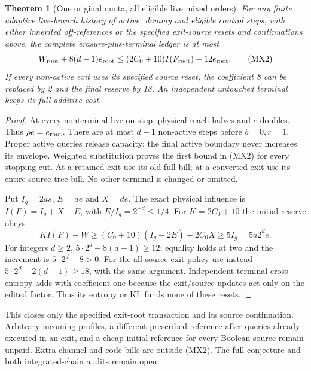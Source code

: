 \documentclass[11pt]{article}
\newtheorem{theorem}[lemma]{Theorem}
\begin{document}
\begin{theorem}[One original quota, all eligible live mixed orders]
For any finite adaptive live-branch history of active, dummy and
eligible control steps, with either inherited off-references or
the specified exit-source resets and continuations above, the
complete erasure-plus-terminal ledger is at most
\[
 W_{\rm root}+8(d-1)e_{\rm root}
 \le (2C_0+10)I(F_{\rm root})-12e_{\rm root}.
 \tag{MX2}
\]
If every non-active exit uses its specified source reset, the
coefficient 8 can be replaced by 2 and the final reserve by 18.
An independent untouched terminal keeps its full additive cost.
\end{theorem}
\begin{proof}
At every nonterminal live on-step, physical reach halves and
$e$ doubles. Thus $\rho e=e_{\rm root}$. There are at most
$d-1$ non-active steps before $b=0,r=1$. Proper active queries
release capacity; the final active boundary never increases its
envelope. Weighted substitution proves the first bound in (MX2)
for every stopping cut. At a retained exit use its old full bill;
at a converted exit use its entire source-tree bill. No other
terminal is changed or omitted.

Put $I_g=2as$, $E=ae$ and $X=de$. The exact physical influence
is $I(F)=I_g+X-E$, with $E/I_g=2^{-d}\le1/4$. For
$K=2C_0+10$ the initial reserve obeys
\[
 KI(F)-W\ge(C_0+10)(I_g-2E)+2C_0X\ge5I_g
              =5a2^d e.
\]
For integers $d\ge2$, $5\cdot2^d-8(d-1)\ge12$; equality
holds at two and the increment is $5\cdot2^d-8>0$.
For the all-source-exit policy use instead
$5\cdot2^d-2(d-1)\ge18$, with the same argument.
Independent terminal cross entropy adds with coefficient one
because the exit/source updates act only on the edited factor.
Thus its entropy or KL funds none of these resets.
\end{proof}

This closes only the specified exit-root transaction and its
source continuation. Arbitrary incoming profiles, a different
prescribed reference after queries already executed in an exit,
and a cheap initial reference for every Boolean source remain
unpaid. Extra channel and code bills are outside (MX2).
The full conjecture and both integrated-chain audits remain open.
\end{document}
